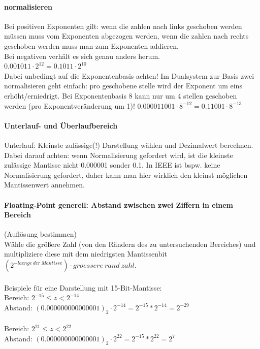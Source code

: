 \documentclass[a4paper]{article}
\begin{document}
		\paragraph{normalisieren} 
			Bei positiven Exponenten gilt: wenn die zahlen nach links geschoben werden müssen muss vom Exponenten abgezogen werden, wenn die zahlen nach rechts geschoben werden muss man zum Exponenten addieren.\\
			Bei negativen verhält es sich genau anders herum.\\
			$0.001011 \cdot 2^{12} = 0.1011 \cdot 2^{10}$\\
			Dabei unbedingt auf die Exponentenbasis achten! Im Dualsystem zur Basis zwei normalisieren geht einfach: pro geschobene stelle wird der Exponent um eins erhöht/erniedrigt. Bei Exponentenbasis 8 kann nur um 4 stellen geschoben werden (pro Exponentveränderung um 1)!
			$0.000011001 \cdot 8^{-12} = 0.11001 \cdot 8^{-13}$
		\paragraph{Unterlauf- und Überlaufbereich}
			Unterlauf: Kleinste zulässige(!) Darstellung wählen und Dezimalwert berechnen. Dabei darauf achten: wenn Normalisierung gefordert wird, ist die kleinste zulässige Mantisse nicht 0.000001 sonder 0.1. In IEEE ist bspw. keine Normalisierung gefordert, daher kann man hier wirklich den kleinst möglichen Mantissenwert annehmen.
		\paragraph{Floating-Point generell: Abstand zwischen zwei Ziffern in einem Bereich} (Auflösung bestimmen)
			\\Wähle die größere Zahl (von den Rändern des zu untersuchenden Bereiches) und multipliziere diese mit dem niedrigsten Mantissenbit $(2^{-laenge~der~Mantisse}) \cdot groessere~rand~zahl$.\\
			\\Beispiele für eine Darstellung mit 15-Bit-Mantisse:
			\\Bereich: $2^{-15} \leq z < 2^{-14}$
			\\Abstand: $(0.000000000000001)_2 \cdot 2^{-14} = 2^{-15}*2^{-14} = 2^{-29}$\\
			\\Bereich: $2^{21} \leq z < 2^{22}$
			\\Abstand: $(0.000000000000001)_2 \cdot 2^{22} = 2^{-15}*2^{22} = 2^{7}$
\end{document}
